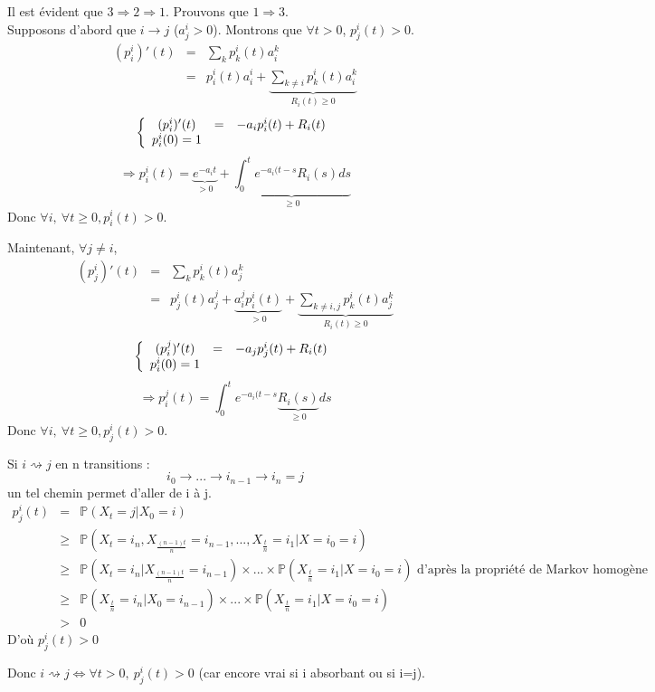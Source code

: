 \begin{dem}
Il est évident que $3\Rightarrow 2\Rightarrow 1$. Prouvons que $1\Rightarrow 3$.\\
Supposons d'abord que $i\to j$ ($a_j^i>0$). Montrons que $\forall t>0$, $p_j^i(t)>0$.
\begin{eqnarray*}
	(p_i^i)'(t)&=&\sum_k p_k^i(t)a_i^k\\
		&=& p_i^i(t)a_i^i + \underbrace{\sum_{k\neq i} p_k^i(t)a_i^k}_{R_i(t)\geq 0}
\end{eqnarray*}
\[\left\{\begin{array}{c c c}
(p_i^i)'(t)&=&-a_ip_i^i(t)+R_i(t)\\
p_i^i(0)=1
\end{array}\right.\]
\[\Rightarrow p^i_i(t)=\underbrace{e^{-a_i t}}_{>0} + \underbrace{\int_0^t e^{-a_i(t-s}R_i(s) ds}_{\geq 0}\]
Donc $\forall i,\ \forall t\geq 0, p_i^i(t)>0$. 

\bigskip
Maintenant, $\forall j\neq i$,
\begin{eqnarray*}
	(p_j^i)'(t)&=&\sum_k p_k^i(t)a_j^k\\
		&=& p_j^i(t)a_j^j +\underbrace{a_i^j p_i^i(t)}_{>0} + \underbrace{\sum_{k\neq i,j} p_k^i(t)a_j^k}_{R_i(t)\geq 0}
\end{eqnarray*}
\[\left\{\begin{array}{c c c}
(p_i^j)'(t)&=&-a_jp_j^i(t)+R_i(t)\\
p_i^i(0)=1
\end{array}\right.\]
\[\Rightarrow p^j_i(t)=\int_0^t e^{-a_i(t-s}\underbrace{R_i(s)}_{\geq 0} ds\]
Donc $\forall i,\ \forall t\geq 0, p_j^i(t)>0$. 

\bigskip
Si $i\rightsquigarrow j$ en n transitions :
	\[i_0\to ... \to i_{n-1}\to i_n=j\]
un tel chemin permet d'aller de i à j.
\begin{eqnarray*}
p_j^i(t)&=&\mathbb{P}(X_t=j|X_0=i)\\
	&\geq&\mathbb{P}(X_t=i_n,X_{\frac{(n-1)t}{n}}=i_{n-1},...,X_{\frac{t}{n}}=i_1|X=i_0=i)\\
	&\geq&\mathbb{P}(X_t=i_n|X_{\frac{(n-1)t}{n}}=i_{n-1})\times...\times\mathbb{P}(X_{\frac{t}{n}}=i_1|X=i_0=i) \text{ d'après la propriété de Markov homogène}\\
	&\geq&\mathbb{P}(X_\frac{t}{n}=i_n|X_0=i_{n-1})\times...\times\mathbb{P}(X_{\frac{t}{n}}=i_1|X=i_0=i)\\
	&>& 0
\end{eqnarray*}
D'où $p_j^i(t)>0$
\end{dem}
Donc $i\rightsquigarrow j\Leftrightarrow \forall t>0,\ p_j^i(t)>0$ (car encore vrai si i absorbant ou si i=j).

